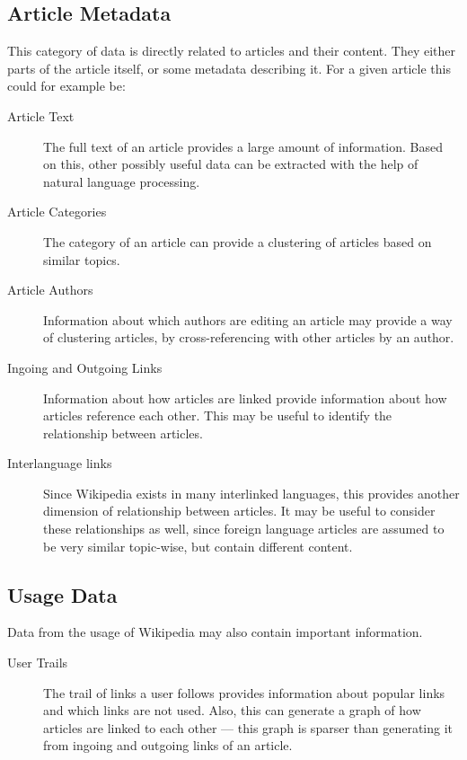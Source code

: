 \subsection{Article Metadata}
This category of data is directly related to articles and their content. They either parts of the article itself, or some metadata describing it. For a given article this could for example be:
\begin{description}
  \item[Article Text] The full text of an article provides a large amount of information. Based on this, other possibly useful data can be extracted with the help of natural language processing.
  \item[Article Categories] The category of an article can provide a clustering of articles based on similar topics.
  \item[Article Authors] Information about which authors are editing an article may provide a way of clustering articles, by cross-referencing with other articles by an author.
  \item[Ingoing and Outgoing Links] Information about how articles are linked provide information about how articles reference each other. This may be useful to identify the relationship between articles.
  \item[Interlanguage links] Since Wikipedia exists in many interlinked languages, this provides another dimension of relationship between articles. It may be useful to consider these relationships as well, since foreign language articles are assumed to be very similar topic-wise, but contain different content.
\end{description}

\subsection{Usage Data}
Data from the usage of Wikipedia may also contain important information.
\begin{description}
  \item[User Trails] The trail of links a user follows provides information about popular links and which links are not used. Also, this can generate a graph of how articles are linked to each other --- this graph is sparser than generating it from ingoing and outgoing links of an article.
\end{description}

